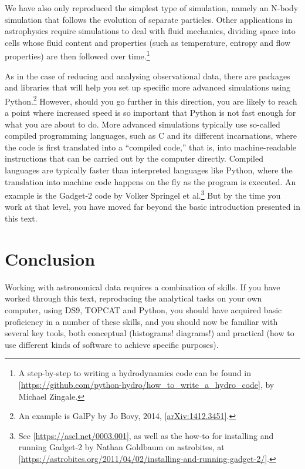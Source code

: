 \documentclass[twocolumn,apj]{openjournal}
\begin{document}
We have also only reproduced the simplest type of simulation, namely an N-body simulation that follows the evolution of separate particles. Other applications in astrophysics require simulations to deal with fluid mechanics, dividing space into cells whose fluid content and properties (such as temperature, entropy and flow properties) are then followed over time.\footnote{A step-by-step to writing a hydrodynamics code can be found in [\href{https://github.com/python-hydro/how_to_write_a_hydro_code}{https://github.com/python-hydro/how\_to\_write\_a\_hydro\_code}], by Michael Zingale.}

As in the case of reducing and analysing observational data, there are packages and libraries that will help you set up specific more advanced simulations using Python.\footnote{An example is GalPy by Jo Bovy, 2014, [\href{https://arxiv.org/abs/1412.3451}{arXiv:1412.3451}].} However, should you go further in this direction, you are likely to reach a point where increased speed is so important that Python is not fast enough for what you are about to do. More advanced simulations typically use so-called compiled programming languages, such as C and its different incarnations, where the code is first translated into a ``compiled code,'' that is, into machine-readable instructions that can be carried out by the computer directly. Compiled languages are typically faster than interpreted languages like Python, where the translation into machine code happens on the fly as the program is executed. An example is the Gadget-2 code by Volker Springel et al.\footnote{See
[\href{https://ascl.net/0003.001}{https://ascl.net/0003.001}], as well as the how-to for installing and running Gadget-2 by Nathan Goldbaum on astrobites, at [\href{https://astrobites.org/2011/04/02/installing-and-running-gadget-2/}{https://astrobites.org/2011/04/02/installing-and-running-gadget-2/}].} But by the time you work at that level, you have moved far beyond the basic introduction presented in this text.

\section{Conclusion}

Working with astronomical data requires a combination of skills. If you have worked through this text, reproducing the analytical tasks on your own computer, using DS9, TOPCAT and Python, you should have acquired basic proficiency in a number of these skills, and you should now be familiar with several key tools, both conceptual (histograms! diagrams!) and practical (how to use different kinds of software to achieve specific purposes).
\end{document}
